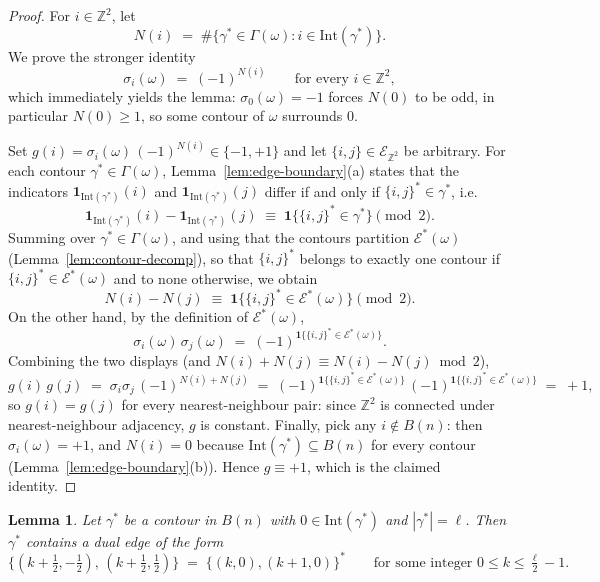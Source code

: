 \documentclass[11pt]{article}
\theoremstyle{plain}
\newtheorem{lemma}[theorem]{Lemma}
\theoremstyle{definition}
\theoremstyle{remark}
\newcommand{\Z}{\mathbb{Z}}
\newcommand{\sg}{\sigma}
\newcommand{\Eset}{\mathscr{E}}
\newcommand{\Intr}{\mathrm{Int}}    %
\newcommand{\Gam}{\Gamma}           %
\newcommand{\dedges}{\mathscr{E}^*} %
\begin{document}
\begin{proof}
For $i\in\Z^2$, let
\[
  N(i)\;=\;\#\big\{\gamma^*\in\Gam(\omega) : i\in\Intr(\gamma^*)\big\}.
\]
We prove the stronger identity
\[
  \sg_i(\omega)\;=\;(-1)^{N(i)}
  \qquad\text{for every } i\in\Z^2,
\]
which immediately yields the lemma: $\sg_0(\omega)=-1$ forces $N(0)$ to be
odd, in particular $N(0)\ge1$, so some contour of $\omega$ surrounds $0$.

Set $g(i)=\sg_i(\omega)\,(-1)^{N(i)}\in\{-1,+1\}$ and let
$\{i,j\}\in\Eset_{\Z^2}$ be arbitrary. For each contour
$\gamma^*\in\Gam(\omega)$, Lemma~\ref{lem:edge-boundary}(a) states that the
indicators $\mathbf 1_{\Intr(\gamma^*)}(i)$ and
$\mathbf 1_{\Intr(\gamma^*)}(j)$ differ if and only if
$\{i,j\}^*\in\gamma^*$, i.e.
\[
  \mathbf 1_{\Intr(\gamma^*)}(i)-\mathbf 1_{\Intr(\gamma^*)}(j)
  \;\equiv\;
  \mathbf 1\big\{\{i,j\}^*\in\gamma^*\big\}
  \pmod 2 .
\]
Summing over $\gamma^*\in\Gam(\omega)$, and using that the contours
partition $\dedges(\omega)$ (Lemma~\ref{lem:contour-decomp}), so that
$\{i,j\}^*$ belongs to exactly one contour if
$\{i,j\}^*\in\dedges(\omega)$ and to none otherwise, we obtain
\[
  N(i)-N(j)\;\equiv\;\mathbf 1\big\{\{i,j\}^*\in\dedges(\omega)\big\}
  \pmod 2 .
\]
On the other hand, by the definition of $\dedges(\omega)$,
\[
  \sg_i(\omega)\,\sg_j(\omega)
  \;=\;(-1)^{\mathbf 1\{\{i,j\}^*\in\dedges(\omega)\}} .
\]
Combining the two displays (and $N(i)+N(j)\equiv N(i)-N(j)\bmod 2$),
\[
  g(i)\,g(j)
  \;=\;\sg_i\sg_j\,(-1)^{N(i)+N(j)}
  \;=\;(-1)^{\mathbf 1\{\{i,j\}^*\in\dedges(\omega)\}}\,
       (-1)^{\mathbf 1\{\{i,j\}^*\in\dedges(\omega)\}}
  \;=\;+1 ,
\]
so $g(i)=g(j)$ for every nearest-neighbour pair: since $\Z^2$ is connected
under nearest-neighbour adjacency, $g$ is constant. Finally, pick any
$i\notin B(n)$: then $\sg_i(\omega)=+1$, and $N(i)=0$ because
$\Intr(\gamma^*)\subseteq B(n)$ for every contour
(Lemma~\ref{lem:edge-boundary}(b)). Hence $g\equiv+1$, which is the claimed
identity.
\end{proof}

\begin{lemma}\label{lem:cross}
Let $\gamma^*$ be a contour in $B(n)$ with $0\in\Intr(\gamma^*)$ and
$|\gamma^*|=\ell$. Then $\gamma^*$ contains a dual edge of the form
\[
  \big\{(k+\tfrac12,-\tfrac12),\,(k+\tfrac12,\tfrac12)\big\}
  \;=\;\big\{(k,0),(k+1,0)\big\}^*
  \qquad\text{for some integer } 0\le k\le \tfrac{\ell}{2}-1 .
\]
\end{lemma}
\end{document}
